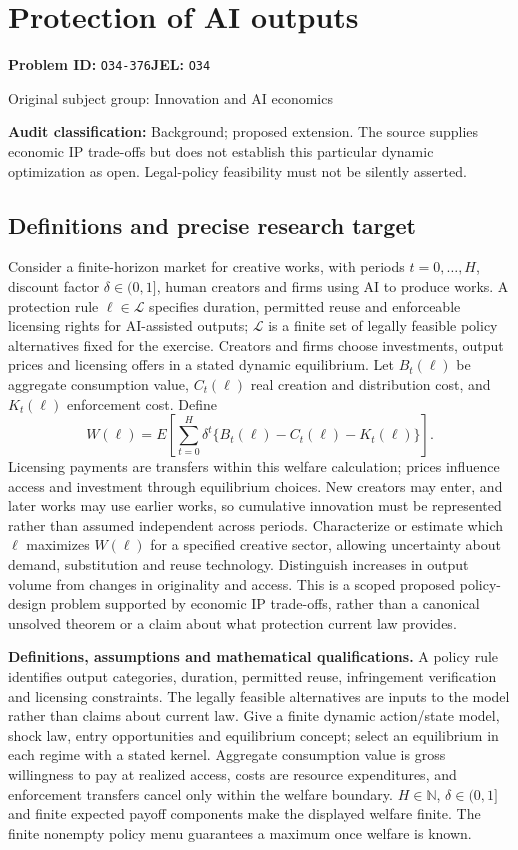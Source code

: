 \documentclass[11pt,a4paper]{article}
\begin{document}
\section*{Protection of AI outputs}
\textbf{Problem ID:} \texttt{O34-376}\quad \textbf{JEL:} \texttt{O34}\par
\label{problem:OP-0416}
{\sffamily\small\color{muted}Original subject group: Innovation and AI economics\par}
\label{definitions:problem:30007698}
\textbf{Audit classification:} Background; proposed extension. The source supplies economic IP trade-offs but does not establish this particular dynamic optimization as open. Legal-policy feasibility must not be silently asserted.
\subsection*{Definitions and precise research target}
Consider a finite-horizon market for creative works, with periods \(t=0,\ldots,H\), discount factor \(\delta\in(0,1]\), human creators and firms using AI to produce works. A protection rule \(\ell\in\mathcal L\) specifies duration, permitted reuse and enforceable licensing rights for AI-assisted outputs; \(\mathcal L\) is a finite set of legally feasible policy alternatives fixed for the exercise. Creators and firms choose investments, output prices and licensing offers in a stated dynamic equilibrium. Let \(B_t(\ell)\) be aggregate consumption value, \(C_t(\ell)\) real creation and distribution cost, and \(K_t(\ell)\) enforcement cost. Define
\[
W(\ell)=E\!\left[\sum_{t=0}^{H}\delta^t\{B_t(\ell)-C_t(\ell)-K_t(\ell)\}\right].
\]
Licensing payments are transfers within this welfare calculation; prices influence access and investment through equilibrium choices. New creators may enter, and later works may use earlier works, so cumulative innovation must be represented rather than assumed independent across periods. Characterize or estimate which \(\ell\) maximizes \(W(\ell)\) for a specified creative sector, allowing uncertainty about demand, substitution and reuse technology. Distinguish increases in output volume from changes in originality and access. This is a scoped proposed policy-design problem supported by economic IP trade-offs, rather than a canonical unsolved theorem or a claim about what protection current law provides.

\textbf{Definitions, assumptions and mathematical qualifications.} A policy rule identifies output categories, duration, permitted reuse, infringement verification and licensing constraints. The legally feasible alternatives are inputs to the model rather than claims about current law. Give a finite dynamic action/state model, shock law, entry opportunities and equilibrium concept; select an equilibrium in each regime with a stated kernel. Aggregate consumption value is gross willingness to pay at realized access, costs are resource expenditures, and enforcement transfers cancel only within the welfare boundary. \(H\in\mathbb N\), \(\delta\in(0,1]\) and finite expected payoff components make the displayed welfare finite. The finite nonempty policy menu guarantees a maximum once welfare is known.
\end{document}
